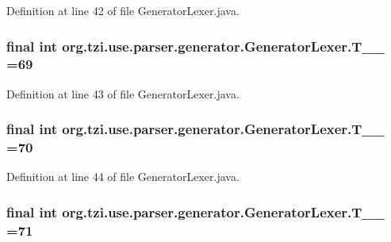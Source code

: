 Definition at line 42 of file Generator\-Lexer.\-java.

\hypertarget{classorg_1_1tzi_1_1use_1_1parser_1_1generator_1_1_generator_lexer_a9e0f0682ddb0645f7d8dddfc74410b07}{
\subsubsection[{T\-\_\-\-\_\-69}]{\setlength{\rightskip}{0pt plus 5cm}final int org.\-tzi.\-use.\-parser.\-generator.\-Generator\-Lexer.\-T\-\_\-\-\_ =69\hspace{0.3cm}{\ttfamily [static]}}}\label{classorg_1_1tzi_1_1use_1_1parser_1_1generator_1_1_generator_lexer_a9e0f0682ddb0645f7d8dddfc74410b07}


Definition at line 43 of file Generator\-Lexer.\-java.

\hypertarget{classorg_1_1tzi_1_1use_1_1parser_1_1generator_1_1_generator_lexer_a9c11c6679eab054379dc187e22a30563}{
\subsubsection[{T\-\_\-\-\_\-70}]{\setlength{\rightskip}{0pt plus 5cm}final int org.\-tzi.\-use.\-parser.\-generator.\-Generator\-Lexer.\-T\-\_\-\-\_ =70\hspace{0.3cm}{\ttfamily [static]}}}\label{classorg_1_1tzi_1_1use_1_1parser_1_1generator_1_1_generator_lexer_a9c11c6679eab054379dc187e22a30563}


Definition at line 44 of file Generator\-Lexer.\-java.

\hypertarget{classorg_1_1tzi_1_1use_1_1parser_1_1generator_1_1_generator_lexer_a8050ce03e058757b30971eeeb86f1359}{
\subsubsection[{T\-\_\-\-\_\-71}]{\setlength{\rightskip}{0pt plus 5cm}final int org.\-tzi.\-use.\-parser.\-generator.\-Generator\-Lexer.\-T\-\_\-\-\_ =71\hspace{0.3cm}{\ttfamily [static]}}}\label{classorg_1_1tzi_1_1use_1_1parser_1_1generator_1_1_generator_lexer_a8050ce03e058757b30971eeeb86f1359}


